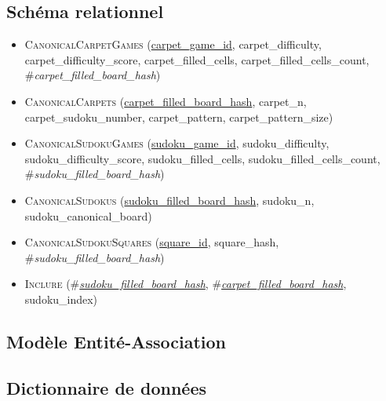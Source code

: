 \documentclass[a4paper]{article}
\newcommand{\relat}[1]{\textsc{#1}}
\newcommand{\attr}[1]{#1}
\newcommand{\prim}[1]{\uline{#1}}
\newcommand{\foreign}[1]{\#\textsl{#1}}
\begin{document}
\newpage
\subsection{Schéma relationnel}
\begin{itemize}
  \item \relat{CanonicalCarpetGames} (\prim{carpet\_game\_id}, \attr{carpet\_difficulty}, \attr{carpet\_difficulty\_score}, \attr{carpet\_filled\_cells}, \attr{carpet\_filled\_cells\_count}, \foreign{carpet\_filled\_board\_hash})
  \item \relat{CanonicalCarpets} (\prim{carpet\_filled\_board\_hash}, \attr{carpet\_n}, \attr{carpet\_sudoku\_number}, \attr{carpet\_pattern}, \attr{carpet\_pattern\_size})
  \item \relat{CanonicalSudokuGames} (\prim{sudoku\_game\_id}, \attr{sudoku\_difficulty}, \attr{sudoku\_difficulty\_score}, \attr{sudoku\_filled\_cells}, \attr{sudoku\_filled\_cells\_count}, \foreign{sudoku\_filled\_board\_hash})
  \item \relat{CanonicalSudokus} (\prim{sudoku\_filled\_board\_hash}, \attr{sudoku\_n}, \attr{sudoku\_canonical\_board})
  \item \relat{CanonicalSudokuSquares} (\prim{square\_id}, \attr{square\_hash}, \foreign{sudoku\_filled\_board\_hash})
  \item \relat{Inclure} (\foreign{\prim{sudoku\_filled\_board\_hash}}, \foreign{\prim{carpet\_filled\_board\_hash}}, \attr{sudoku\_index})
\end{itemize} 

\bigskip
\subsection{Modèle Entité-Association}
\begin{center}
    
\end{center}

\subsection{Dictionnaire de données}
\end{document}
